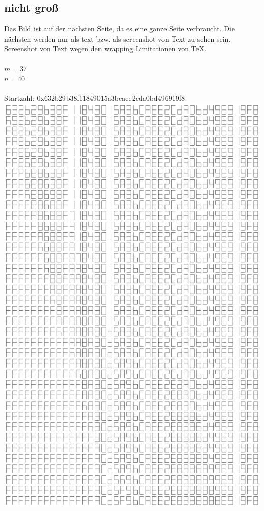 \documentclass[a4paper,10pt,ngerman]{scrartcl}
\begin{document}
\subsection{nicht groß}

Das Bild ist auf der nächsten Seite, da es eine ganze Seite verbraucht. Die nächsten werden nur als text bzw. als screenshot von Text zu sehen sein. Screenshot von Text wegen den wrapping Limitationen von \TeX.
\\
\\
$m=37$
\\
$n=40$
\\
\\
Startzahl: 0x632b29b38f11849015a3bcaee2cda0bd496919f8
\newpage
\noindent \includegraphics[scale=.4]{solutions/hexmax2.png} 
\end{document}
